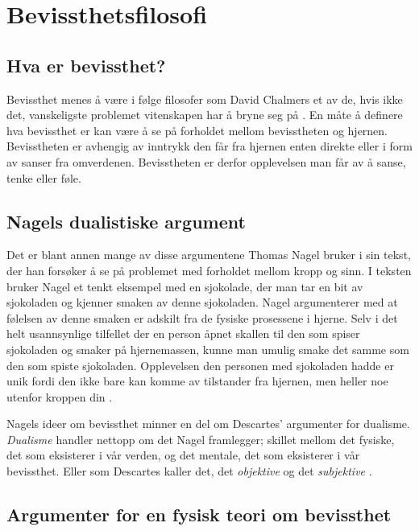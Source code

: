 \section{Bevissthetsfilosofi}

\subsection{Hva er bevissthet?}

Bevissthet menes å være i følge filosofer som David Chalmers et av de, hvis ikke det, 
vanskeligste problemet vitenskapen har å bryne seg på \autocite{Chalmers1995}. 
En måte å definere hva bevissthet er kan være å se på forholdet mellom bevisstheten og hjernen.
Bevisstheten er avhengig av inntrykk den får fra hjernen enten direkte eller i form av sanser fra omverdenen. 
Bevisstheten er derfor opplevelsen man får av å sanse, tenke eller føle. 

\subsection{Nagels dualistiske argument}

Det er blant annen mange av disse argumentene Thomas Nagel bruker i sin tekst, 
der han forsøker å se på problemet med forholdet mellom kropp og sinn.
I teksten bruker Nagel et tenkt eksempel med en sjokolade,
der man tar en bit av sjokoladen og kjenner smaken av denne sjokoladen. 
Nagel argumenterer med at følelsen av denne smaken er adskilt fra de fysiske prosessene i hjerne. 
Selv i det helt usannsynlige tilfellet der en person åpnet skallen til den som spiser sjokoladen og smaker på hjernemassen, 
kunne man umulig smake det samme som den som spiste sjokoladen.
Opplevelsen den personen med sjokoladen hadde er unik fordi den ikke bare kan komme av tilstander fra hjernen, 
men heller noe utenfor kroppen din \autocite[32-34]{Nagel2003}. 

Nagels ideer om bevissthet minner en del om Descartes' argumenter for dualisme.
\textit{Dualisme} handler nettopp om det Nagel framlegger; 
skillet mellom det fysiske, det som eksisterer i vår verden, og det mentale, det som eksisterer i vår bevissthet. 
Eller som Descartes kaller det, det \textit{objektive} og det \textit{subjektive} \autocite[156]{Dybvig2003}.


\subsection{Argumenter for en fysisk teori om bevissthet}


